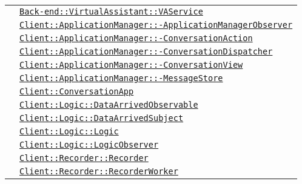\begin{longtable}{|>{\centering}m{3cm}|m{10cm}<{\centering}|}
& \hyperref[Back-end::VirtualAssistant::VAService]{\texttt{Back-end::VirtualAssistant::VAService}}\\
& \hyperref[Client::ApplicationManager::ApplicationManagerObserver]{\texttt{Client::ApplicationManager::-\linebreak ApplicationManagerObserver}}\\
& \hyperref[Client::ApplicationManager::ConversationAction]{\texttt{Client::ApplicationManager::-\linebreak ConversationAction}}\\
& \hyperref[Client::ApplicationManager::ConversationDispatcher]{\texttt{Client::ApplicationManager::-\linebreak ConversationDispatcher}}\\
& \hyperref[Client::ApplicationManager::ConversationView]{\texttt{Client::ApplicationManager::-\linebreak ConversationView}}\\
& \hyperref[Client::ApplicationManager::MessageStore]{\texttt{Client::ApplicationManager::-\linebreak MessageStore}}\\
& \hyperref[Client::ConversationApp]{\texttt{Client::ConversationApp}}\\
& \hyperref[Client::Logic::DataArrivedObservable]{\texttt{Client::Logic::DataArrivedObservable}}\\
& \hyperref[Client::Logic::DataArrivedSubject]{\texttt{Client::Logic::DataArrivedSubject}}\\
& \hyperref[Client::Logic::Logic]{\texttt{Client::Logic::Logic}}\\
& \hyperref[Client::Logic::LogicObserver]{\texttt{Client::Logic::LogicObserver}}\\
& \hyperref[Client::Recorder::Recorder]{\texttt{Client::Recorder::Recorder}}\\
& \hyperref[Client::Recorder::RecorderWorker]{\texttt{Client::Recorder::RecorderWorker}}\\ \hline


\end{longtable}
